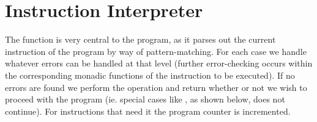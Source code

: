 \section{Instruction Interpreter}
The function  is very central to the program, as it parses
out the current instruction of the program by way of pattern-matching. For
each case we handle whatever errors can be handled at that level (further
error-checking occurs within the corresponding monadic functions of the
instruction to be executed). If no errors are found we perform the operation
and return whether or not we wish to proceed with the program (ie. special
cases like , as shown below, does not continue). For instructions that need it the
program counter is incremented.

